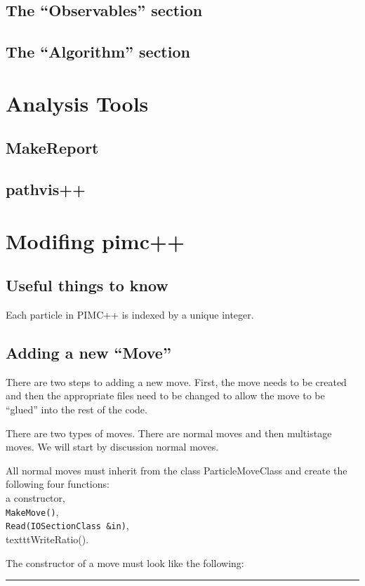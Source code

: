 \documentclass{book}
\begin{document}
\section{The ``Observables'' section}
\section{The ``Algorithm'' section}

\chapter{Analysis Tools}
\section{MakeReport}
\section{pathvis++}


\chapter{Modifing pimc++}
\section{Useful things to know}
Each particle in PIMC++ is indexed by a unique integer. 
\section{Adding a new ``Move''}
There are two steps to adding a new move. First, the move needs to be
created and then the appropriate files need to be changed to allow the
move to be ``glued'' into the rest of the code.

There are two types of moves. There are normal moves and then
multistage moves. We will start by discussion normal moves.

All normal moves must inherit from the class ParticleMoveClass and 
create the following four functions: \\
a constructor,\\
\texttt{MakeMove()},\\
\texttt{Read(IOSectionClass \&in)},  \\
texttt{WriteRatio()}.

The constructor of a move must look like the following:\\

\rule{0.6cm}{0cm}
\end{document}
